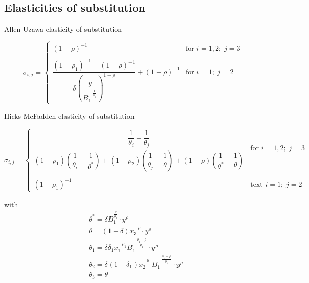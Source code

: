 \subsection{Elasticities of substitution}
\label{sec:elaSub3}

Allen-Uzawa elasticity of substitution
\citep[see][]{sato67} 

\begin{equation}
\sigma_{i,j} = \begin{cases} 
        (1 - \rho )^{-1}
        & \text{for } i = 1,2; \; j=3 \\ 
        & \\
        \dfrac{(1-\rho_1)^{-1} - (1-\rho)^{-1}}
        {\delta \left( \dfrac{y}{
        B_1^{-\frac{1}{\rho_1}}}\right)^{1+\rho}}+(1-\rho)^{-1}
        & \text{for } i=1; \; j=2 
   \end{cases}
\end{equation}  


Hicks-McFadden elasticity of substitution
\citep[see][]{sato67} 

\begin{equation}
\sigma_{i,j} = \begin{cases}
        \dfrac{\dfrac{1}{\theta_i} + \dfrac{1}{\theta_j}}
        {(1-\rho_1) \left( \dfrac{1}{\theta_i} - \dfrac{1}{\theta^*} \right)
        + (1-\rho_2) \left( \dfrac{1}{\theta_j} - \dfrac{1}{\theta} \right)
        + (1-\rho) \left( \dfrac{1}{\theta^*} - \dfrac{1}{\theta} \right) }
        & \text{for } i=1,2; \; j=3 \\ 
        & \\
        (1-\rho_1)^{-1}
        & \mbox{text } i=1; \; j=2 
   \end{cases}
\end{equation} 

with 
\begin{align}
& \theta^* = \delta
            B_1^{\frac{\rho}{\rho_1}} \cdot y^\rho \\
& \theta = (1-\delta) x_3^{-\rho} \cdot y^{\rho} \\
& \theta_1 = \delta \delta_1 x_1^{-\rho_1} 
            B_1^{-\frac{\rho_1 - \rho}{\rho_1}}
            \cdot y^{\rho} \\
& \theta_2 = \delta (1 - \delta_1) x_2^{-\rho_1} 
            B_1^{-\frac{\rho_1 - \rho}{\rho_1}}
            \cdot y^{\rho} \\
& \theta_3 = \theta
\end{align}
